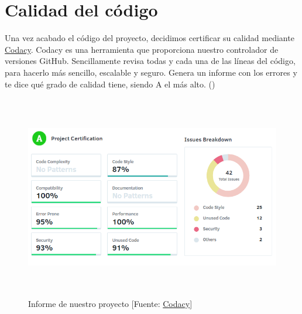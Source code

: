\section{Calidad del código}
\label{makereference6.4}

Una vez acabado el código del proyecto, decidimos certificar su calidad mediante \href{https://www.codacy.com}{Codacy}.
Codacy es una herramienta que proporciona nuestro controlador de versiones GitHub. Sencillamente revisa todas y cada una de las líneas del código, para hacerlo más sencillo, escalable y seguro. Genera un informe con los errores y te dice qué grado de calidad tiene, siendo A el más alto. (\cite{ARP:Codacy:2017})

\begin{figure}[htb]
	\begin{center}
		\includegraphics[height=3.5in]{figures/codacy.png}
		\caption{Informe de nuestro proyecto [Fuente: \href{https://www.codacy.com}{Codacy}] \label{codacy}}
	\end{center}
\end{figure}